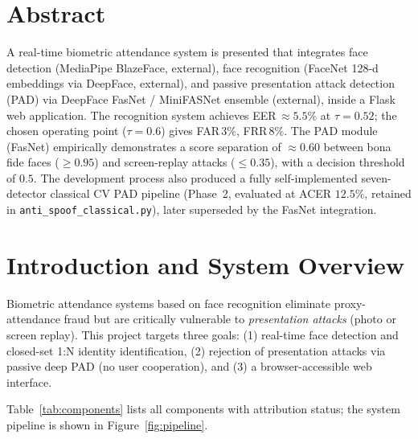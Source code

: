 \documentclass[10pt,a4paper]{article}
\begin{document}
\tableofcontents
\newpage

\section*{Abstract}

A real-time biometric attendance system is presented that integrates face detection
(MediaPipe BlazeFace, external), face recognition (FaceNet 128-d embeddings via
DeepFace, external), and passive presentation attack detection (PAD) via DeepFace
FasNet / MiniFASNet ensemble (external), inside a Flask web application.
The recognition system achieves EER\,$\approx\!5.5\%$ at $\tau\!=\!0.52$; the
chosen operating point ($\tau\!=\!0.6$) gives FAR\,$3\%$, FRR\,$8\%$.
The PAD module (FasNet) empirically demonstrates a score separation of $\approx\!0.60$
between bona fide faces ($\geq\!0.95$) and screen-replay attacks ($\leq\!0.35$),
with a decision threshold of $0.5$.
The development process also produced a fully self-implemented seven-detector
classical CV PAD pipeline (Phase~2, evaluated at ACER $12.5\%$, retained in
\texttt{anti\_spoof\_classical.py}), later superseded by the FasNet integration.

\section{Introduction and System Overview}
\label{sec:intro}

Biometric attendance systems based on face recognition eliminate proxy-attendance
fraud but are critically vulnerable to \emph{presentation attacks} (photo or screen
replay).
This project targets three goals: (1) real-time face detection and closed-set 1:N
identity identification, (2) rejection of presentation attacks via passive deep
PAD (no user cooperation), and (3) a browser-accessible web interface.

Table~\ref{tab:components} lists all components with attribution status; the
system pipeline is shown in Figure~\ref{fig:pipeline}.
\end{document}
